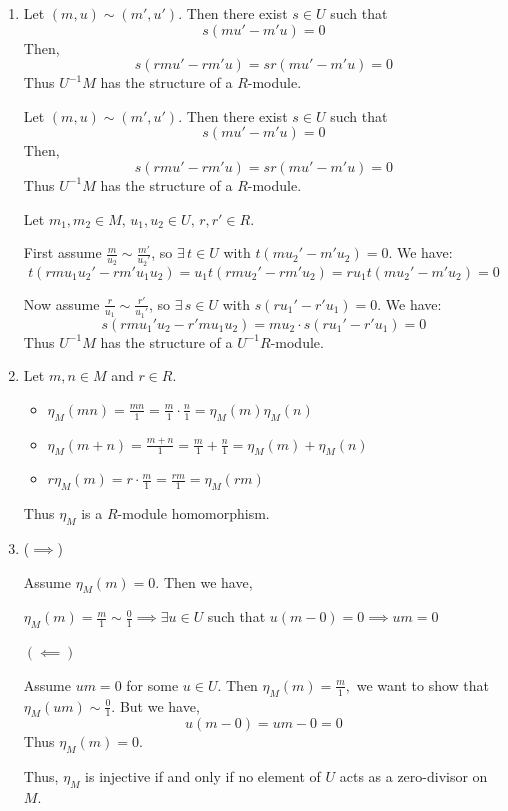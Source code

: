 \documentclass[Notebook.tex]{subfiles}
\begin{document}
\begin{solution}
\begin{enumerate}
		And note that associativity, commutativity, and distributivity  are inherited from $R$. 
		
		Thus $U^{-1}M$ is an abelian group. 

		\item Let $(m, u) \sim (m', u')$. Then there exist $s \in U$ such that 
		\[s(mu' - m'u) = 0\]
		Then, 
		\[s(rmu' - rm'u) = sr(mu' - m'u) = 0\]
		Thus $U^{-1}M$ has the structure of a $R$-module. 

		Let $(m, u) \sim (m', u')$. Then there exist $s \in U$ such that 
		\[s(mu' - m'u) = 0\]
		Then, 
		\[s(rmu' - rm'u) = sr(mu' - m'u) = 0\]
		Thus $U^{-1}M$ has the structure of a $R$-module. 


		\bbni 
		
		Let $m_1, m_2 \in M, \, u_1, u_2 \in U, \, r, r' \in R$. 

		First assume $\frac{m}{u_2} \sim \frac{m'}{u_2'}$, so $\exists\, t \in U$ with $t(mu_2' - m'u_2) = 0$. We have:
		\[
		t(rmu_1u_2' - rm'u_1u_2) = u_1t(rmu_2' - rm'u_2) = ru_1t(mu_2' - m'u_2) = 0 
		\]

		Now assume $\frac{r}{u_1} \sim \frac{r'}{u_1'}$, so $\exists\, s \in U$ with $s(ru_1' - r'u_1) = 0$. We have:
		\[
		s(rmu_1'u_2 - r'mu_1u_2) = mu_2 \cdot s(ru_1' - r'u_1) = 0 
		\]
		Thus $U^{-1}M$ has the structure of a $U^{-1}R$-module. 

		\item Let $m,n \in M$ and $r \in R$. 
		
		\begin{itemize}
			\item $\eta_M(m n) = \frac{mn}{1} = \frac{m}{1} \cdot \frac{n}{1} = \eta_M(m) \eta_M(n)$
			\item $\eta_M(m+n) = \frac{m+n}{1} = \frac{m}{1} + \frac{n}{1} = \eta_M(m) + \eta_M(n)$
			\item $r\eta_M(m) = r \cdot \frac{m}{1} = \frac{rm}{1} = \eta_M(rm)$
		\end{itemize}

		Thus $\eta_M$ is a $R$-module homomorphism. 

		\item ($\implies$)
		
		Assume $\eta_M(m) = 0$. Then we have, 
		
		$\eta_M(m) = \frac{m}{1} \sim \frac{0}{1} \implies \exists u \in U$ such that  $u(m - 0) = 0 \implies u m = 0$

		$(\impliedby)$

		Assume $um = 0$ for some $u \in U$. Then $\eta_M(m) = \frac{m}{1},$ we want to show that $ \eta_M(um) \sim \frac{0}{1}$. But we have, 
		\[u(m-0) = um - 0 = 0\]
		Thus $\eta_M(m) = 0$. 


		Thus, $\eta_M$ is injective if and only if no element of $U$ acts as a zero-divisor on $M$. 
	\end{enumerate}
\end{solution}
\end{document}
